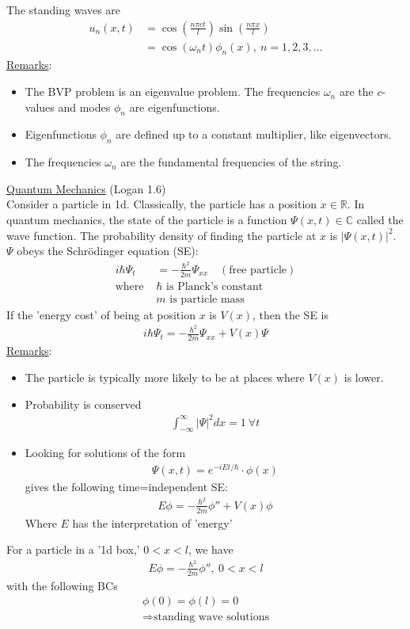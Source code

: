 \documentclass[12pt, letterpaper]{article}
\begin{document}
The standing waves are 
    \begin{align*}
        u_n(x,t) &= \cos\left(\frac{n\pi ct}{l}\right)\sin \left(\frac{n\pi x}{l}\right) \\
        &= \cos(\omega_n t)\phi_n(x),\ n = 1,2,3,\dots
    \end{align*}
\underline{Remarks}:
\begin{itemize}
    \item The BVP problem is an eigenvalue problem. The frequencies $\omega_n$
    are the $c$-values and modes $\phi_n$ are eigenfunctions.
    \item Eigenfunctions $\phi_n$ are defined up to a constant multiplier,
    like eigenvectors.
    \item The frequencies $\omega_n$ are the fundamental frequencies of the string.
\end{itemize}
\underline{Quantum Mechanics} (Logan 1.6) \\
Consider a particle in 1d. Classically, the particle has a position $x\in \mathbb{R}$.
In quantum mechanics, the state of the particle is a function $\Psi(x,t)\in \mathbb{C}$
called the wave function. The probability density of finding the particle at $x$ is 
$|\Psi(x,t)|^2$. $\Psi$ obeys the Schrödinger equation (SE):
\begin{align*}
    i\hbar \Psi_t &= -\frac{\hbar^2}{2m}\Psi_{xx} \quad (\text{free particle}) \\
    \text{where } &\hbar \text{ is Planck's constant} \\
    &m \text{ is particle mass}
\end{align*}
If the 'energy cost' of being at position $x$ is $V(x)$, then the SE is 
\begin{align*}
    i\hbar \Psi_t = -\frac{\hbar^2}{2m} \Psi_{xx}+V(x)\Psi
\end{align*}
\underline{Remarks}:
\begin{itemize}
    \item The particle is typically more likely to be at places where $V(x)$ is lower.
    \item Probability is conserved
    \begin{align*}
        \int_{-\infty}^{\infty}|\Psi|^2dx = 1 \ \forall t
    \end{align*}
    \item Looking for solutions of the form 
    \begin{align*}
        \Psi(x,t) = e^{-iEt/\hbar}\cdot \phi(x)
    \end{align*}
    gives the following time=independent SE:
    \begin{align*}
        E\phi = -\frac{\hbar^2}{2m}\phi'' + V(x)\phi
    \end{align*}
    Where $E$ has the interpretation of 'energy'
\end{itemize}
For a particle in a '1d box,' $0 < x < l$, we have 
\begin{align*}
    E\phi = -\frac{\hbar^2}{2m}\phi'',\ 0 < x < l
\end{align*}
with the following BCs
\begin{align*}
    \phi(0) = \phi(l) = 0 \\
    \Rightarrow \text{standing wave solutions}
\end{align*}
\end{document}

